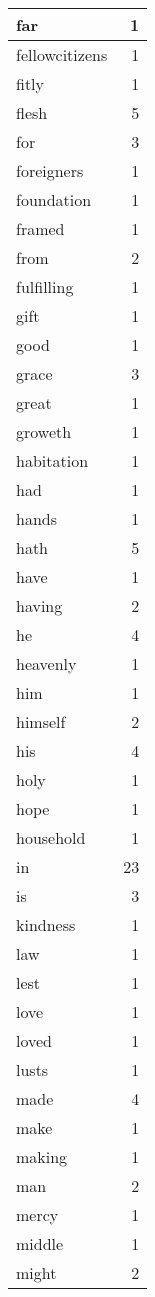 \begin{center}
\begin{longtable}{l|r}
far & 1\\ \hline 
fellowcitizens & 1\\ \hline 
fitly & 1\\ \hline 
flesh & 5\\ \hline 
for & 3\\ \hline 
foreigners & 1\\ \hline 
foundation & 1\\ \hline 
framed & 1\\ \hline 
from & 2\\ \hline 
fulfilling & 1\\ \hline 
gift & 1\\ \hline 
good & 1\\ \hline 
grace & 3\\ \hline 
great & 1\\ \hline 
groweth & 1\\ \hline 
habitation & 1\\ \hline 
had & 1\\ \hline 
hands & 1\\ \hline 
hath & 5\\ \hline 
have & 1\\ \hline 
having & 2\\ \hline 
he & 4\\ \hline 
heavenly & 1\\ \hline 
him & 1\\ \hline 
himself & 2\\ \hline 
his & 4\\ \hline 
holy & 1\\ \hline 
hope & 1\\ \hline 
household & 1\\ \hline 
in & 23\\ \hline 
is & 3\\ \hline 
kindness & 1\\ \hline 
law & 1\\ \hline 
lest & 1\\ \hline 
love & 1\\ \hline 
loved & 1\\ \hline 
lusts & 1\\ \hline 
made & 4\\ \hline 
make & 1\\ \hline 
making & 1\\ \hline 
man & 2\\ \hline 
mercy & 1\\ \hline 
middle & 1\\ \hline 
might & 2\\ \hline 

\end{longtable}
\end{center}
